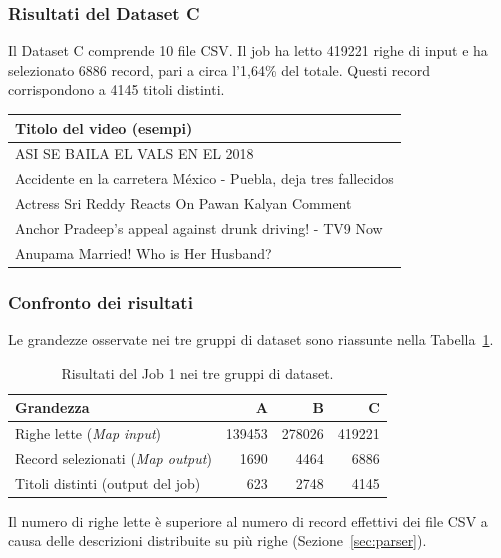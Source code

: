 \documentclass[12pt, a4paper]{article}
\begin{document}
\subsubsection{Risultati del Dataset C}

Il Dataset C comprende 10 file CSV.
Il job ha letto 419221 righe di input e ha selezionato 6886 record,
pari a circa l'1,64\% del totale.
Questi record corrispondono a 4145 titoli distinti.

\begin{center}
\small
\begin{tabular}{|p{}|}
\hline
\textbf{Titolo del video (esempi)} \\
\hline
ASI SE BAILA EL VALS EN EL 2018 \\
Accidente en la carretera México - Puebla, deja tres fallecidos \\
Actress Sri Reddy Reacts On Pawan Kalyan Comment \\
Anchor Pradeep's appeal against drunk driving! - TV9 Now \\
Anupama Married! Who is Her Husband? \\
\hline
\end{tabular}
\end{center}

\subsubsection{Confronto dei risultati}

Le grandezze osservate nei tre gruppi di dataset
sono riassunte nella Tabella~\ref{tab:job1risultati}.

\begin{table}[H]
\centering
\small
\begin{tabular}{|l|r|r|r|}
\hline
\textbf{Grandezza} &
\textbf{A} &
\textbf{B} &
\textbf{C} \\
\hline
Righe lette (\textit{Map input}) & 139453 & 278026 & 419221 \\
Record selezionati (\textit{Map output}) & 1690 & 4464 & 6886 \\
Titoli distinti (output del job) & 623 & 2748 & 4145 \\
\hline
\end{tabular}
\caption{Risultati del Job 1 nei tre gruppi di dataset.}
\label{tab:job1risultati}
\end{table}

Il numero di righe lette è superiore al numero
di record effettivi dei file CSV a causa delle
descrizioni distribuite su più righe
(Sezione~\ref{sec:parser}).
\end{document}
